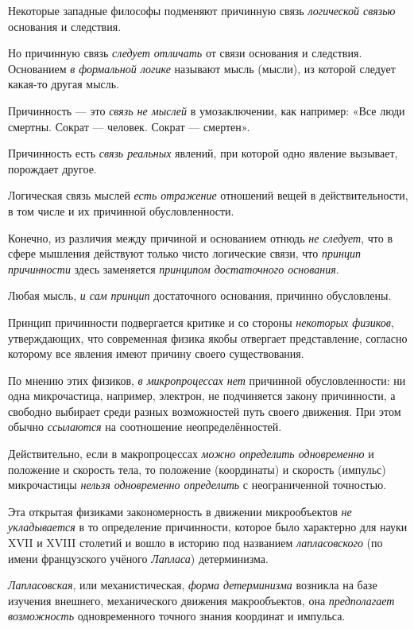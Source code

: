 \documentclass[a4paper,14pt,russian]{extreport}
\begin{document}
Некоторые западные философы подменяют причинную связь \emph{логической связью} основания и следствия.

Но причинную связь \emph{следует отличать} от связи основания и следствия. Основанием \emph{в формальной логике} называют мысль (мысли), из которой следует какая-то другая мысль.

Причинность --- это \emph{связь не мыслей} в умозаключении, как например: «Все люди смертны. Сократ --- человек. Сократ --- смертен».

Причинность есть \emph{связь реальных} явлений, при которой одно явление вызывает, порождает другое.

Логическая связь мыслей \emph{есть отражение} отношений вещей в действительности, в том числе и их причинной обусловленности.

Конечно, из различия между причиной и основанием отнюдь \emph{не следует}, что в сфере мышления действуют только чисто логические связи, что \emph{принцип причинности} здесь заменяется \emph{принципом достаточного основания}.

Любая мысль, \emph{и сам принцип} достаточного основания, причинно обусловлены.

Принцип причинности подвергается критике и со стороны \emph{некоторых физиков}, утверждающих, что современная физика якобы отвергает представление, согласно которому все явления имеют причину своего существования.

По мнению этих физиков, \emph{в микропроцессах нет} причинной обусловленности: ни одна микрочастица, например, электрон, не подчиняется закону причинности, а свободно выбирает среди разных возможностей путь своего движения. При этом обычно \emph{ссылаются} на соотношение неопределённостей.

Действительно, если в макропроцессах \emph{можно определить одновременно} и положение и скорость тела, то положение (координаты) и скорость (импульс) микрочастицы \emph{нельзя одновременно определить} с неограниченной точностью.

Эта открытая физиками закономерность в движении микрообъектов \emph{не укладывается} в то определение причинности, которое было характерно для науки XVII и XVIII столетий и вошло в историю под названием \emph{лапласовского} (по имени французского учёного \emph{Лапласа}) детерминизма.

\emph{Лапласовская}, или механистическая, \emph{форма детерминизма} возникла на базе изучения внешнего, механического движения макрообъектов, она \emph{предполагает возможность} одновременного точного знания координат и импульса.
\end{document}
